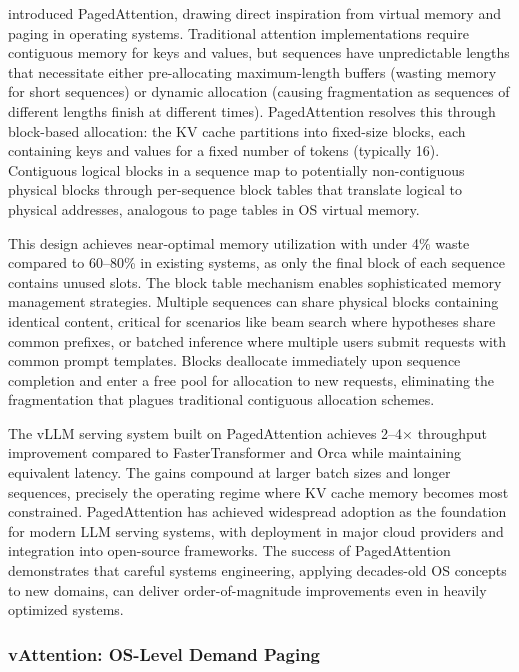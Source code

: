 \documentclass[11pt,letterpaper]{article}
\begin{document}
\cite{kwon2023efficient} introduced PagedAttention, drawing direct inspiration from virtual memory and paging in operating systems. Traditional attention implementations require contiguous memory for keys and values, but sequences have unpredictable lengths that necessitate either pre-allocating maximum-length buffers (wasting memory for short sequences) or dynamic allocation (causing fragmentation as sequences of different lengths finish at different times). PagedAttention resolves this through block-based allocation: the KV cache partitions into fixed-size blocks, each containing keys and values for a fixed number of tokens (typically 16). Contiguous logical blocks in a sequence map to potentially non-contiguous physical blocks through per-sequence block tables that translate logical to physical addresses, analogous to page tables in OS virtual memory.

This design achieves near-optimal memory utilization with under 4\% waste compared to 60--80\% in existing systems, as only the final block of each sequence contains unused slots. The block table mechanism enables sophisticated memory management strategies. Multiple sequences can share physical blocks containing identical content, critical for scenarios like beam search where hypotheses share common prefixes, or batched inference where multiple users submit requests with common prompt templates. Blocks deallocate immediately upon sequence completion and enter a free pool for allocation to new requests, eliminating the fragmentation that plagues traditional contiguous allocation schemes.

The vLLM serving system built on PagedAttention achieves 2--4$\times$ throughput improvement compared to FasterTransformer and Orca while maintaining equivalent latency. The gains compound at larger batch sizes and longer sequences, precisely the operating regime where KV cache memory becomes most constrained. PagedAttention has achieved widespread adoption as the foundation for modern LLM serving systems, with deployment in major cloud providers and integration into open-source frameworks. The success of PagedAttention demonstrates that careful systems engineering, applying decades-old OS concepts to new domains, can deliver order-of-magnitude improvements even in heavily optimized systems.

\subsubsection{vAttention: OS-Level Demand Paging}
\end{document}
